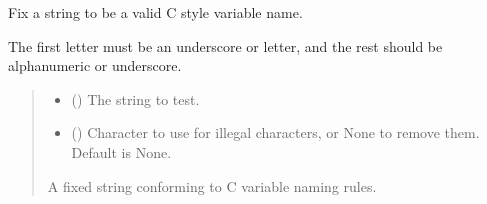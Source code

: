 \documentclass[letterpaper,12pt,english]{sphinxmanual}
\begin{document}
\begin{fulllineitems}
\label{\detokenize{api/core:cbmpy.CBCommon.fixId}}
\pysigstartsignatures
\pysiglinewithargsret
{}
{\sphinxparamcomma {}}
{}
\pysigstopsignatures
\sphinxAtStartPar
Fix a string to be a valid C style variable name.

\sphinxAtStartPar
The first letter must be an underscore or letter, and the rest should be alphanumeric or underscore.
\begin{quote}\begin{description}
\begin{itemize}
\item {} 
\sphinxAtStartPar
{} () \textendash{} The string to test.

\item {} 
\sphinxAtStartPar
{} (\sphinxstyleliteralemphasis{\sphinxupquote{, }}) \textendash{} Character to use for illegal characters, or None to remove them. Default is None.

\end{itemize}

\sphinxAtStartPar
{} \textendash{} A fixed string conforming to C variable naming rules.

\end{description}\end{quote}

\end{fulllineitems}

\end{document}

